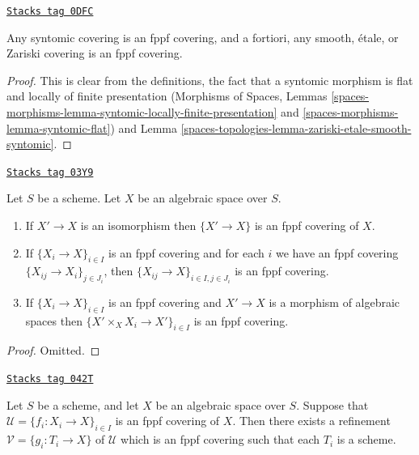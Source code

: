 \begin{lemma}
\label{spaces-topologies-lemma-zariski-etale-smooth-syntomic-fppf}
\href{https://stacks.math.columbia.edu/tag/0DFC}{\texttt{Stacks tag 0DFC}}

Any syntomic covering is an fppf covering, and a fortiori,
any smooth, \'etale, or Zariski covering is an fppf covering.
\end{lemma}

\begin{proof}
This is clear from the definitions, the fact that a syntomic morphism
is flat and locally of finite presentation
(Morphisms of Spaces, Lemmas
\ref{spaces-morphisms-lemma-syntomic-locally-finite-presentation} and
\ref{spaces-morphisms-lemma-syntomic-flat}) and
Lemma \ref{spaces-topologies-lemma-zariski-etale-smooth-syntomic}.
\end{proof}

\begin{lemma}[Fppf]
\label{spaces-topologies-lemma-fppf}
\href{https://stacks.math.columbia.edu/tag/03Y9}{\texttt{Stacks tag 03Y9}}

Let $S$ be a scheme.
Let $X$ be an algebraic space over $S$.
\begin{enumerate}
\item If $X' \to X$ is an isomorphism then $\{X' \to X\}$
is an fppf covering of $X$.
\item If $\{X_i \to X\}_{i\in I}$ is an fppf covering and for each
$i$ we have an fppf covering $\{X_{ij} \to X_i\}_{j\in J_i}$, then
$\{X_{ij} \to X\}_{i \in I, j\in J_i}$ is an fppf covering.
\item If $\{X_i \to X\}_{i\in I}$ is an fppf covering
and $X' \to X$ is a morphism of algebraic spaces then
$\{X' \times_X X_i \to X'\}_{i\in I}$ is an fppf covering.
\end{enumerate}
\end{lemma}

\begin{proof}
Omitted.
\end{proof}

\begin{lemma}
\label{spaces-topologies-lemma-refine-fppf-schemes}
\href{https://stacks.math.columbia.edu/tag/042T}{\texttt{Stacks tag 042T}}

Let $S$ be a scheme, and let $X$ be an algebraic space over $S$.
Suppose that $\mathcal{U} = \{f_i : X_i \to X\}_{i \in I}$ is an
fppf covering of $X$. Then there exists a refinement
$\mathcal{V} = \{g_i : T_i \to X\}$ of $\mathcal{U}$ which is an
fppf covering such that each $T_i$ is a scheme.
\end{lemma}

